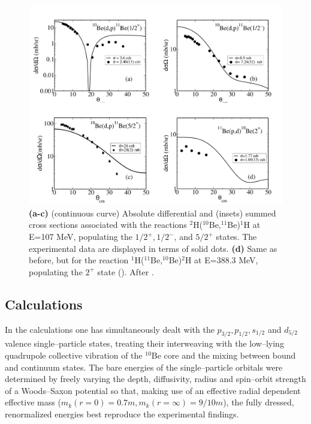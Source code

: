             \begin{figure}
            \centerline{\includegraphics*[width=16cm,angle=0]{C8/figsC8/fig6_2_5}}
            	\caption{ {\bf (a-c)} (continuous curve) Absolute differential and (insets) summed cross sections associated with the reactions  
            	$^2$H($^{10}$Be,$^{11}$Be)$^1$H at E=107 MeV, populating the   ${1/2^+, 1/2^-}$, and ${5/2^+ }$ states.
            	The experimental data  \cite{Schmitt:13}  are displayed in terms of solid dots.
            	{\bf (d)} Same as before, but for the reaction  $^1$H($^{11}$Be,$^{10}$Be)$^2$H at E=388.3 MeV, populating the  ${2^+ }$ state 
            	(\cite{Winfield:01}). After \cite{Barranco:17}.}\label{fig6.2.5}
            \end{figure} 
\subsection{Calculations}


   In the calculations one has simultaneously dealt with the $p_{3/2}, p_{1/2},s_{1/2}$ and $d_{5/2}$ valence
   single--particle states,
   treating their interweaving with the low--lying quadrupole collective vibration
   of the $^{10}$Be core and  the mixing 
   between bound and continuum states.   
The bare energies of the single--particle orbitals were determined by freely varying the depth, diffusivity, radius and spin--orbit strength of a Woods--Saxon potential so that, making use of an effective radial dependent effective mass ($m_k(r=0)=0.7m, m_k(r=\infty)=9/10m$), the fully dressed, renormalized energies best reproduce the experimental findings.  


